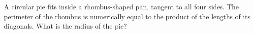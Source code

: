 A circular pie fits inside a rhombus-shaped pan, tangent to all four sides. The perimeter of the rhombus is numerically equal to the product of the lengths of its diagonals. What is the radius of the pie?
